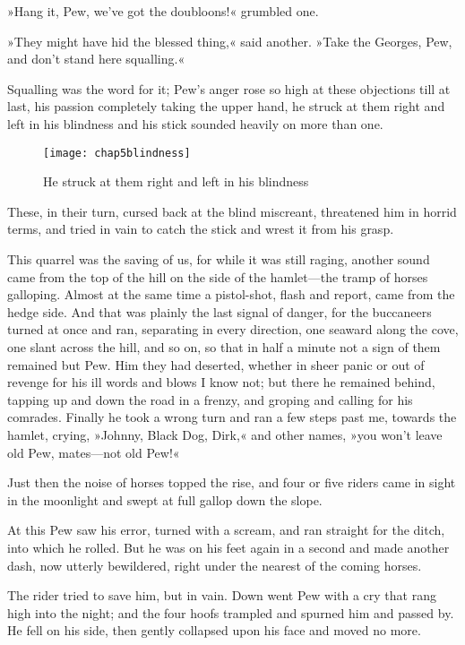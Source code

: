 »Hang it, Pew, we've got the doubloons!« grumbled one.

»They might have hid the blessed thing,« said another. »Take the Georges, Pew, and don't stand here squalling.«

Squalling was the word for it; Pew's anger rose so high at these objections till at last, his passion completely taking the upper hand, he struck at them right and left in his blindness and his stick sounded heavily on more than one.

\begin{sidewaysfigure}
\texttt{[image: chap5blindness]}%
\caption{He struck at them right and left in his blindness}
\end{sidewaysfigure} 

These, in their turn, cursed back at the blind miscreant, threat\-ened him in horrid terms, and tried in vain to catch the stick and wrest it from his grasp.

This quarrel was the saving of us, for while it was still raging, another sound came from the top of the hill on the side of the hamlet—the tramp of horses galloping. Almost at the same time a pistol-shot, flash and report, came from the hedge side. And that was plainly the last signal of danger, for the buccaneers turned at once and ran, separating in every direction, one seaward along the cove, one slant across the hill, and so on, so that in half a minute not a sign of them remained but Pew. Him they had deserted, whether in sheer panic or out of revenge for his ill words and blows I know not; but there he remained behind, tapping up and down the road in a frenzy, and groping and calling for his comrades. Finally he took a wrong turn and ran a few steps past me, towards the hamlet, crying, »Johnny, Black Dog, Dirk,« and other names, »you won't leave old Pew, mates—not old Pew!«

Just then the noise of horses topped the rise, and four or five riders came in sight in the moonlight and swept at full gallop down the slope.

At this Pew saw his error, turned with a scream, and ran straight for the ditch, into which he rolled. But he was on his feet again in a second and made another dash, now utterly bewildered, right under the nearest of the coming horses.

The rider tried to save him, but in vain. Down went Pew with a cry that rang high into the night; and the four hoofs trampled and spurned him and passed by. He fell on his side, then gently collapsed upon his face and moved no more.

